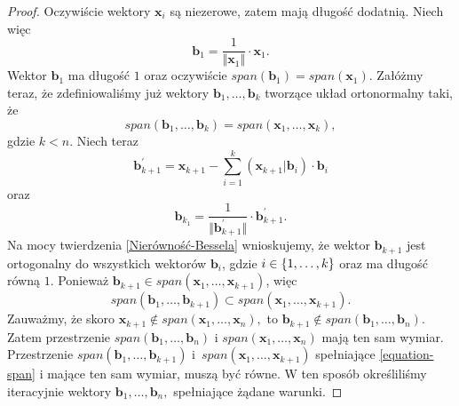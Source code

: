 \documentclass[12pt,a4paper]{report}
\newcommand{\vr}[1]{\mathbf{#1}}
\begin{document}
\begin{proof}
Oczywiście wektory $\vr{x}_{i}$ są niezerowe, zatem mają długość dodatnią. Niech więc
$$
\vr{b}_{1}=\frac{1}{\Vert \vr{x}_{1} \Vert}\cdot\vr{x}_{1}.
$$
Wektor $\vr{b}_{1}$ ma długość $1$ oraz oczywiście $span(\vr{b}_{1}) = span (\vr{x}_{1})$. Załóżmy teraz, że zdefiniowaliśmy już wektory $\vr{b}_{1}, \ldots, \vr{b}_{k}$ tworzące układ ortonormalny taki, że
$$
span(\vr{b}_{1}, \ldots, \vr{b}_{k}) = span(\vr{x}_{1}, \ldots, \vr{x}_{k}),
$$
gdzie $k < n$.
Niech teraz 
$$
\vr{b}_{k+1}^{'} = \vr{x}_{k+1} - \sum_{i=1}^{k}(\vr{x}_{k+1}|\vr{b}_{i})\cdot \vr{b}_{i}
$$
oraz
$$
\vr{b}_{k_1} = \frac{1}{\Vert \vr{b}_{k+1}^{'} \Vert} \cdot \vr{b}_{k+1}^{'}.
$$
Na mocy twierdzenia \ref{Nierówność-Bessela} wnioskujemy, że wektor $\vr{b}_{k+1}$ jest ortogonalny do wszystkich wektorów $\vr{b}_{i}$, gdzie $i\in \left\lbrace {1, \ldots, k} \right\rbrace$ oraz ma długość równą $1$. Ponieważ $\vr{b}_{k+1}\in span(\vr{x}_{1}, \ldots, \vr{x}_{k+1})$, więc
\begin{equation} \label{equation-span}
span(\vr{b}_{1}, \ldots, \vr{b}_{k+1}) \subset span(\vr{x}_{1}, \ldots, \vr{x}_{k+1}).
\end{equation}
Zauważmy, że skoro $\vr{x}_{k+1} \notin span(\vr{x}_{1}, \ldots, \vr{x}_{n}),$ to $\vr{b}_{k+1} \notin span (\vr{b}_{1}, \ldots, \vr{b}_{n}).$ Zatem przestrzenie $span(\vr{b}_{1}, \ldots, \vr{b}_{n})$ i $span(\vr{x}_{1}, \ldots, \vr{x}_{n})$ mają ten sam wymiar.
Przestrzenie $span(\vr{b}_{1}, \ldots, \vr{b}_{k+1})$ i~$span(\vr{x}_{1}, \ldots, \vr{x}_{k+1})$ spełniające \eqref{equation-span} i mające ten sam wymiar, muszą być równe.
W ten sposób określiliśmy iteracyjnie wektory $\vr{b}_{1}, \ldots, \vr{b}_{n},$ spełniające żądane warunki.
\end{proof}
\end{document}
